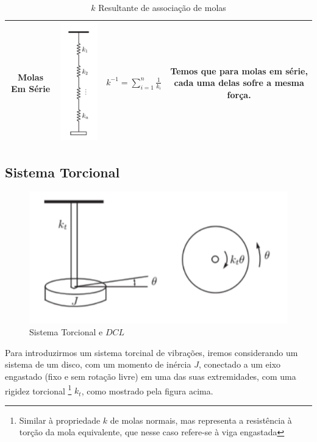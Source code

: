 \documentclass{article}
\begin{document}
\begin{table}[h]
\begin{tabular}{|c|c|c|c|}
        Molas Em Série &
        \begin{minipage}{.3\linewidth}
            \centering
            \includegraphics[width=.2\linewidth]{imgs/mola_eq_6.png}
        \end{minipage}
                       &
        $k^{-1} = \sum_{i = 1}^n \frac{1}{k_i}$
                       &
        \begin{minipage}{0.3\columnwidth}
            Temos que para molas em série, cada uma delas sofre a mesma força.
        \end{minipage}                                \\ \hline
    \end{tabular}
    \caption{$k$ Resultante de associação de molas}
\end{table}


\subsection{Sistema Torcional}

\begin{figure}[h]
    \centering
    \includegraphics[width=.5\textwidth]{imgs/sis_torcional.png}
    \caption{Sistema Torcional e $DCL$}
\end{figure}

Para introduzirmos um sistema torcinal de vibrações, iremos considerando um sistema de um disco, com um momento de inércia $J$, conectado a um eixo engastado (fixo e sem rotação livre) em uma das suas extremidades, com uma rigidez torcional
\footnote{Similar à propriedade $k$ de molas normais, mas representa a resistência à torção da mola equivalente, que nesse caso refere-se à viga engastada}
$k_t$, como mostrado pela figura acima.
\end{document}
